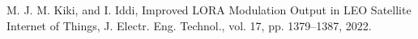\documentclass[journal]{IEEEtran}
\begin{document}
\begin{thebibliography}{99}
	 M. J. M. Kiki, and I. Iddi, Improved LORA Modulation Output in LEO Satellite Internet of Things, J. Electr. Eng. Technol., vol. 17, pp. 1379--1387, 2022.
\end{thebibliography}
\end{document}
